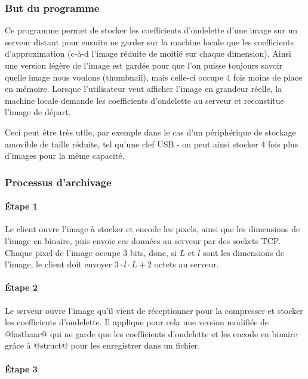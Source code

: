 \documentclass{article}
\begin{document}
\subsubsection{But du programme}


Ce programme permet de stocker les coefficients d'ondelette d'une image sur un serveur distant pour ensuite ne garder sur la machine locale que les coefficients d'approximation (c-à-d l'image réduite de moitié sur chaque dimension). Ainsi une version légère de l'image est gardée pour que l'on puisse toujours savoir quelle image nous voulons (thumbnail), mais celle-ci occupe 4 fois moins de place en mémoire. Lorsque l'utilisateur veut afficher l'image en grandeur réelle, la machine locale demande les coefficients d'ondelette au serveur et reconstitue l'image de départ.

Ceci peut être très utile, par exemple dans le cas d'un périphérique de stockage amovible de taille réduite, tel qu'une clef USB - on peut ainsi stocker 4 fois plus d'images pour la même capacité.


\subsubsection{Processus d'archivage}

\paragraph{Étape 1}

Le client ouvre l'image à stocker et encode les pixels, ainsi que les dimensions de l'image en binaire, puis envoie ces données au serveur par des sockets TCP. Chaque pixel de l'image occupe 3 bits, donc, si $L$ et $l$ sont les dimensions de l'image, le client doit envoyer $3\cdot{}l\cdot{}L + 2$ octets au serveur.

\paragraph{Étape 2}

Le serveur ouvre l'image qu'il vient de réceptionner pour la compresser et stocker les coefficients d'ondelette. Il applique pour cela une version modifiée de @fasthaar@ qui ne garde que les coefficients d'ondelette et les encode en binaire grâce à @struct@ pour les enregistrer dans un fichier.

\paragraph{Étape 3}
\end{document}
